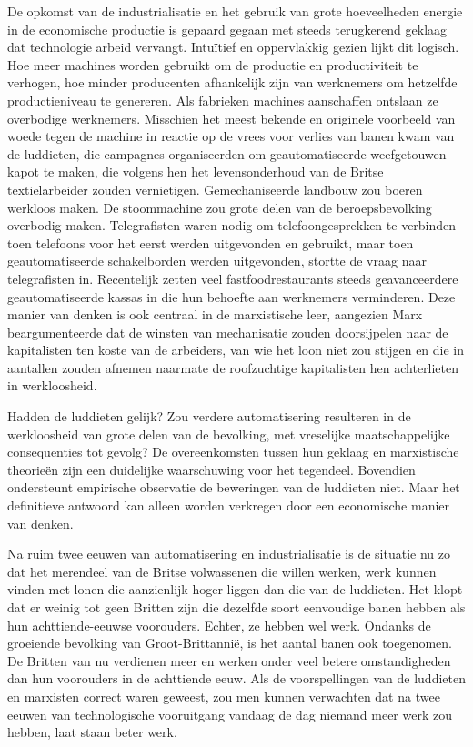 De opkomst van de industrialisatie en het gebruik van grote hoeveelheden energie in de economische productie is gepaard gegaan met steeds terugkerend geklaag dat technologie arbeid vervangt. Intuïtief en oppervlakkig gezien lijkt dit logisch. Hoe meer machines worden gebruikt om de productie en productiviteit te verhogen, hoe minder producenten afhankelijk zijn van werknemers om hetzelfde productieniveau te genereren. Als fabrieken machines aanschaffen ontslaan ze overbodige werknemers. Misschien het meest bekende en originele voorbeeld van woede tegen de machine in reactie op de vrees voor verlies van banen kwam van de luddieten, die campagnes organiseerden om geautomatiseerde weefgetouwen kapot te maken, die volgens hen het levensonderhoud van de Britse textielarbeider zouden vernietigen. Gemechaniseerde landbouw zou boeren werkloos maken. De stoommachine zou grote delen van de beroepsbevolking overbodig maken. Telegrafisten waren nodig om telefoongesprekken te verbinden toen telefoons voor het eerst werden uitgevonden en gebruikt, maar toen geautomatiseerde schakelborden werden uitgevonden, stortte de vraag naar telegrafisten in. Recentelijk zetten veel fastfoodrestaurants steeds geavanceerdere geautomatiseerde kassa\textquotesingle s in die hun behoefte aan werknemers verminderen. Deze manier van denken is ook centraal in de marxistische leer, aangezien Marx beargumenteerde dat de winsten van mechanisatie zouden doorsijpelen naar de kapitalisten ten koste van de arbeiders, van wie het loon niet zou stijgen en die in aantallen zouden afnemen naarmate de roofzuchtige kapitalisten hen achterlieten in werkloosheid.

Hadden de luddieten gelijk? Zou verdere automatisering resulteren in de werkloosheid van grote delen van de bevolking, met vreselijke maatschappelijke consequenties tot gevolg? De overeenkomsten tussen hun geklaag en marxistische theorieën zijn een duidelijke waarschuwing voor het tegendeel. Bovendien ondersteunt empirische observatie de beweringen van de luddieten niet. Maar het definitieve antwoord kan alleen worden verkregen door een economische manier van denken.

Na ruim twee eeuwen van automatisering en industrialisatie is de situatie nu zo dat het merendeel van de Britse volwassenen die willen werken, werk kunnen vinden met lonen die aanzienlijk hoger liggen dan die van de luddieten. Het klopt dat er weinig tot geen Britten zijn die dezelfde soort eenvoudige banen hebben als hun achttiende-eeuwse voorouders. Echter, ze hebben wel werk. Ondanks de groeiende bevolking van Groot-Brittannië, is het aantal banen ook toegenomen. De Britten van nu verdienen meer en werken onder veel betere omstandigheden dan hun voorouders in de achttiende eeuw. Als de voorspellingen van de luddieten en marxisten correct waren geweest, zou men kunnen verwachten dat na twee eeuwen van technologische vooruitgang vandaag de dag niemand meer werk zou hebben, laat staan beter werk.


